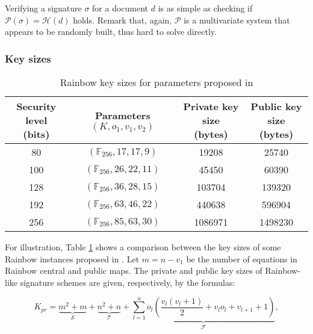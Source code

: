 \documentclass{ufsctex/ufsctex}
\begin{document}
Verifying a signature $\sigma$ for a document $d$ is as simple as checking if
$\mathcal{P}(\sigma) = \mathcal{H}(d)$ holds. Remark that, again, $\mathcal{P}$
is a multivariate system that appears to be randomly built, thus hard to solve
directly.

\subsubsection{Key sizes}

\begin{table}
\begin{center}
\begin{tabular}{|c|c|c|c|}
\hline
\thead{Security level\\(bits)} & \thead{Parameters\\$(K, o_1, v_1, v_2)$}
& \thead{Private key size\\(bytes)} & \thead{Public key size\\(bytes)} \\
\hline
80  & $(\mathbb{F}_{256}, 17, 17, 9)$   & 19208   & 25740   \\ \hline
100 & $(\mathbb{F}_{256}, 26, 22, 11)$  & 45450   & 60390   \\ \hline
128 & $(\mathbb{F}_{256}, 36, 28, 15)$  & 103704  & 139320  \\ \hline
192 & $(\mathbb{F}_{256}, 63, 46, 22)$  & 440638  & 596904  \\ \hline
256 & $(\mathbb{F}_{256}, 85, 63, 30)$  & 1086971 & 1498230 \\ \hline
\end{tabular}
\caption{Rainbow key sizes for parameters proposed in \cite{petzoldt2013thesis}}
\label{tab:rainbowkeysizes}
\end{center}
\end{table}

For illustration, Table \ref{tab:rainbowkeysizes} shows a comparison between
the key sizes of some Rainbow instances proposed in \cite[Chapter
6]{petzoldt2013thesis}. Let $m = n - v_1$ be the number of equations in Rainbow
central and public maps. The private and public key sizes of Rainbow-like
signature schemes are given, respectively, by the formulas:

\begin{equation}\label{eq:rainbowprivatekeysize}
K_{pr} =
\underbrace{m^2 + m}_{\mathcal{S}} + \underbrace{n^2 + n}_{\mathcal{T}} +
\underbrace{\sum_{l=1}^{u} o_l \left(
\frac{v_l(v_l + 1)}{2} + v_l o_l + v_{l+1} + 1
\right)}_{\mathcal{F}},
\end{equation}
\end{document}
